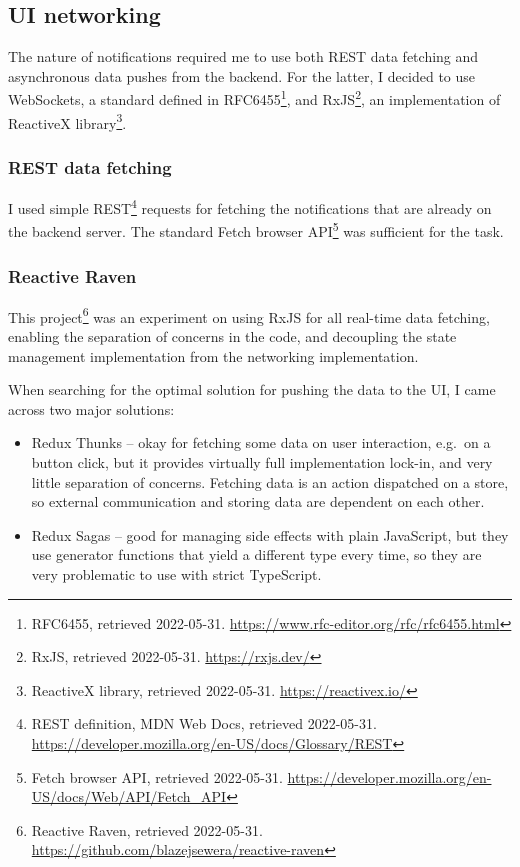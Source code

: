 \hypertarget{ui-networking}{%
	\subsection{UI networking}\label{ui-networking}}

The nature of notifications required me to use both REST data fetching
and asynchronous data pushes from the backend. For the latter, I decided
to use WebSockets, a standard defined in RFC6455\footnote{RFC6455,
	retrieved 2022-05-31.
	\url{https://www.rfc-editor.org/rfc/rfc6455.html}}, and
RxJS\footnote{RxJS, retrieved 2022-05-31. \url{https://rxjs.dev/}}, an
implementation of ReactiveX library\footnote{ReactiveX library,
	retrieved 2022-05-31. \url{https://reactivex.io/}}.

\hypertarget{rest-data-fetching}{%
	\subsubsection{REST data fetching}\label{rest-data-fetching}}

I used simple REST\footnote{REST definition, MDN Web Docs, retrieved
	2022-05-31.
	\url{https://developer.mozilla.org/en-US/docs/Glossary/REST}} requests
for fetching the notifications that are already on the backend server.
The standard Fetch browser API\footnote{Fetch browser API, retrieved
	2022-05-31.
	\url{https://developer.mozilla.org/en-US/docs/Web/API/Fetch_API}} was
sufficient for the task.

\hypertarget{reactive-raven}{%
	\subsubsection{Reactive Raven}\label{reactive-raven}}

This project\footnote{Reactive Raven, retrieved 2022-05-31.
	\url{https://github.com/blazejsewera/reactive-raven}} was an
experiment on using RxJS for all real-time data fetching, enabling the
separation of concerns in the code, and decoupling the state management
implementation from the networking implementation.

When searching for the optimal solution for pushing the data to the UI,
I came across two major solutions:

\begin{itemize}
	\item
	      Redux Thunks -- okay for fetching some data on user interaction,
	      e.g.~on a button click, but it provides virtually full implementation
	      lock-in, and very little separation of concerns. Fetching data is an
	      action dispatched on a store, so external communication and storing
	      data are dependent on each other.
	\item
	      Redux Sagas -- good for managing side effects with plain JavaScript,
	      but they use generator functions that yield a different type every
	      time, so they are very problematic to use with strict TypeScript.
\end{itemize}

